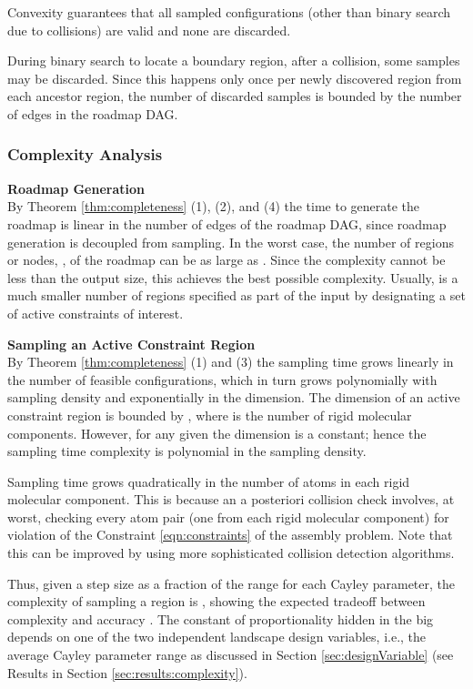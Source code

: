 \documentclass[]{article}
\newcommand{\rmc}{rigid molecular component}
\newcommand{\cone}{\ref{eqn:constraints}}
\begin{document}
Convexity guarantees that all sampled configurations (other than binary search
due to collisions) are valid and none are discarded. 

During binary search to locate a boundary region, after a collision, some
samples may be discarded. Since this happens only once per newly discovered
region from each ancestor region, the number of discarded samples is bounded by
the number of edges in the roadmap DAG.

\subsubsection{Complexity Analysis}
\label{sec:CA}
\noindent \textbf{Roadmap Generation\\}
By Theorem \ref{thm:completeness} (1), (2), and (4)
the time to generate the roadmap is linear in the number of edges of the
roadmap DAG, since roadmap generation is decoupled from sampling.
In the worst case, the number of regions or nodes, , of the roadmap can be as large as .
Since the
complexity cannot be less than the output size, this achieves the best possible
complexity. Usually,  is a much smaller number of regions specified as part
of the input by designating a set of active constraints of interest.

\noindent \textbf{Sampling an Active Constraint Region\\}
By Theorem \ref{thm:completeness} (1) and (3)
the sampling time grows linearly in the number of feasible configurations, which 
in turn grows polynomially with sampling density and exponentially
in the dimension.  The dimension of an active constraint region is bounded by
, where   is the number of \rmc s.  However, for any given  the
dimension is a constant; hence the sampling time complexity is polynomial
in the sampling density.  

Sampling time grows quadratically in  the number of atoms in each \rmc.
This is because an a posteriori collision check involves, at worst, checking
every atom pair (one from each \rmc) for violation of the Constraint \cone
of the assembly problem. 
Note that this can be improved by using more sophisticated collision detection algorithms.

Thus, given a step size  as a fraction of the range for each Cayley parameter, the
complexity of sampling a region is , showing the
expected tradeoff between complexity and accuracy \cite{Ozkan2011}.
The constant of proportionality
hidden in the big  depends on one of the two independent landscape design variables, i.e., the
average Cayley parameter range as discussed in Section
\ref{sec:designVariable} (see Results in Section
\ref{sec:results:complexity}).
\end{document}
